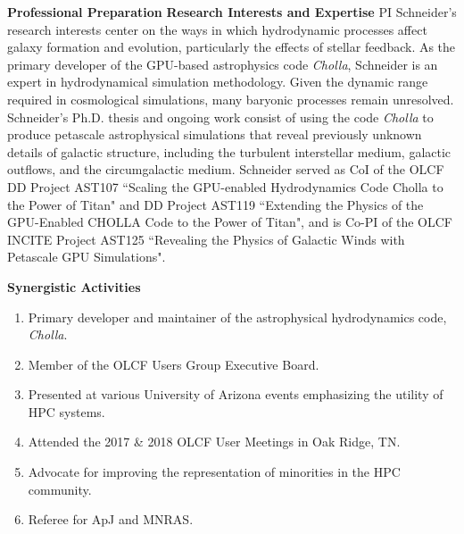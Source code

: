 \documentclass[11pt,letterpaper,english]{article}
\begin{document}
\begin{flushleft} {\bf Professional Preparation}
\vspace{-6pt}
{\bf Research Interests and Expertise}
{\parindent 16pt
PI Schneider's research interests center on the ways in which hydrodynamic processes affect galaxy formation and evolution, particularly the effects of stellar feedback. As the primary developer of the GPU-based astrophysics code \textit{Cholla}, Schneider is an expert in hydrodynamical simulation methodology. Given the dynamic range required in cosmological simulations, many baryonic processes remain unresolved. Schneider's Ph.D. thesis and ongoing work consist of using the code \textit{Cholla} to produce petascale astrophysical simulations that reveal previously unknown details of galactic structure, including the turbulent interstellar medium, galactic outflows, and the circumgalactic medium. Schneider served as CoI of the OLCF DD Project AST107 ``Scaling the GPU-enabled Hydrodynamics Code Cholla to the Power of Titan" and DD Project AST119 ``Extending the Physics of the GPU-Enabled CHOLLA Code to the Power of Titan", and is Co-PI of the OLCF INCITE Project AST125 ``Revealing the Physics of Galactic Winds with Petascale GPU Simulations".
}

\vspace{.04in}
{\bf Synergistic Activities}
\vspace{-6pt}
\begin{enumerate} \itemsep1pt \parskip0pt 
\item Primary developer and maintainer of the astrophysical hydrodynamics code, \textit{Cholla}. \\ 
\item Member of the OLCF Users Group Executive Board. \\
\item Presented at various University of Arizona events emphasizing the utility of HPC systems. \\ 
\item Attended the 2017 \& 2018 OLCF User Meetings in Oak Ridge, TN. \\ 
\item Advocate for improving the representation of minorities in the HPC community. \\
\item Referee for ApJ and MNRAS. \\
\end{enumerate} 


\end{flushleft}
\end{document}
